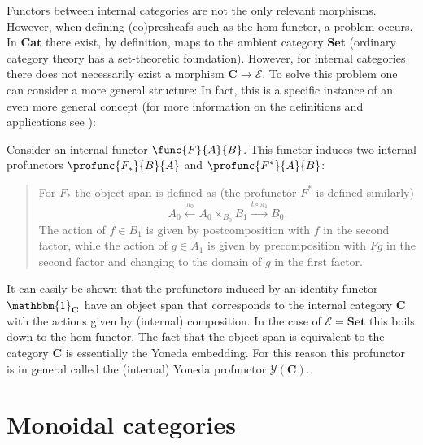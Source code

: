     Functors between internal categories are not the only relevant morphisms. However, when defining (co)presheafs such as the hom-functor, a problem occurs. In $\mathbf{Cat}$ there exist, by definition, maps to the ambient category $\mathbf{Set}$ (ordinary category theory has a set-theoretic foundation). However, for internal categories there does not necessarily exist a morphism $\mathbf{C}\rightarrow\mathcal{E}$. To solve this problem one can consider a more general structure:
    In fact, this is a specific instance of an even more general concept (for more information on the definitions and applications see \cite{maclane, johnstone}):

    \begin{construct}
        Consider an internal functor $\func{F}{A}{B}$. This functor induces two internal profunctors $\profunc{F_*}{B}{A}$ and $\profunc{F^*}{A}{B}$:
        \begin{quote}
            For $F_*$ the object span is defined as (the profunctor $F^*$ is defined similarly) \[A_0\overset{\pi_0}{\longleftarrow}A_0\times_{B_0} B_1\overset{t\circ\pi_1}{\longrightarrow}B_0.\] The action of $f\in B_1$ is given by postcomposition with $f$ in the second factor, while the action of $g\in A_1$ is given by precomposition with $Fg$ in the second factor and changing to the domain of $g$ in the first factor.
        \end{quote}
        It can easily be shown that the profunctors induced by an identity functor $\mathbbm{1}_{\mathbf{C}}$ have an object span that corresponds to the internal category $\mathbf{C}$ with the actions given by (internal) composition. In the case of $\mathcal{E}=\mathbf{Set}$ this boils down to the hom-functor. The fact that the object span is equivalent to the category $\mathbf{C}$ is essentially the Yoneda embedding. For this reason this profunctor is in general called the (internal) Yoneda profunctor $\mathcal{Y}(\mathbf{C})$.
    \end{construct}

\section{Monoidal categories}\label{section:monoidal_categories}

